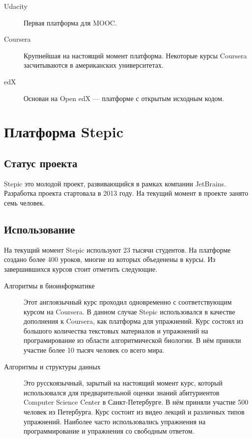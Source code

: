 \documentclass{matmex-diploma-custom}
\begin{document}
\iffalse
#+ORGTBL: SEND plat orgtbl-to-latex :splice nil :skip 0
|----------+---------------+----------------------------------|
|          | год основания | количество студентов на май 2014 |
|----------+---------------+----------------------------------|
| Udacity  |          2011 | 1.6 млн.                         |
| Coursera |          2012 | 7.1 млн.                         |
| edX      |          2012 | 2.1 млн.                         |
|----------+---------------+----------------------------------|
\fi

\begin{description}
\item[Udacity] Первая платформа для MOOC.
\item[Coursera] Крупнейшая на настоящий момент платформа. Некоторые
  курсы Coursera засчитываются в американских университетах.
\item[edX] Основан на Open edX --- платформе с открытым исходным кодом.
\end{description}

\section{Платформа Stepic}

\subsection{Статус проекта}
Stepic \cite{stepic} это молодой проект, развивающийся в рамках компании
JetBrains. Разработка проекта стартовала в 2013 году. На текущий
момент в проекте занято семь человек.

\subsection{Использование}
На текущий момент Stepic используют 23 тысячи студентов. На платформе
создано более 400 уроков, многие из которых объеденены в курсы. Из
завершившихся курсов стоит отметить следующие.

\begin{description}
\item[Алгоритмы в биоинформатике] Этот англоязычный курс проходил
  одновременно с соответствующим курсом на Coursera. В данном случае
  Stepic использовался в качестве дополнения к Coursera, как платформа
  для упражнений. Курс состоял из большого количества текстовых
  материалов и упражнений на програмирование из области
  алгоритмической биологии. В нём приняли участие более 10 тысяч
  человек со всего мира.

\item[Алгоритмы и структуры данных] Это русскоязычный, зарытый на
  настоящий момент курс, который использовался для предварительной
  оценки знаний абитуриентов Computer Science Center в
  Санкт-Петербурге. В нём приняли участие 500 человек из
  Петербурга. Курс состоит из видео лекций и различных типов
  упражнений. Наиболее часто использовались упражнения на
  программирование и упражнения со свободным ответом.
\end{description}
\end{document}
